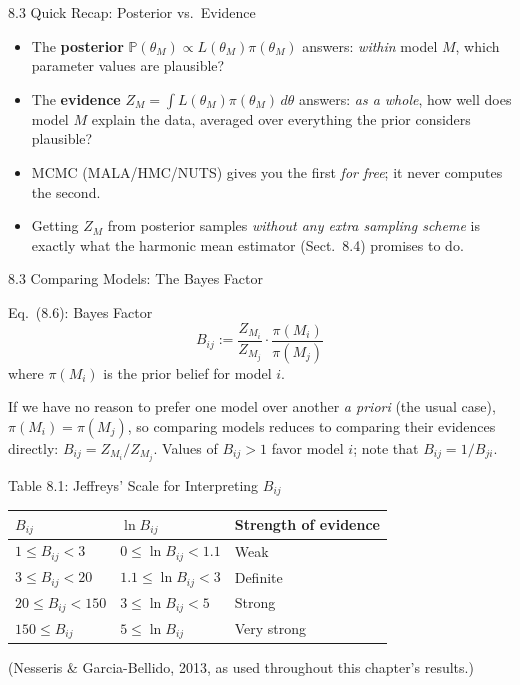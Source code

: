 \documentclass[aspectratio=169,10pt]{beamer}
\begin{document}
\begin{frame}{8.3 Quick Recap: Posterior vs.\ Evidence}
\begin{itemize}
  \item The \textbf{posterior} $\mathbb{P}(\theta_M) \propto L(\theta_M)\pi(\theta_M)$ answers: \emph{within} model $M$, which parameter values are plausible?
  \item The \textbf{evidence} $Z_M = \int L(\theta_M)\pi(\theta_M)\,d\theta$ answers: \emph{as a whole}, how well does model $M$ explain the data, averaged over everything the prior considers plausible?
  \item MCMC (MALA/HMC/NUTS) gives you the first \emph{for free}; it never computes the second.
  \item Getting $Z_M$ from posterior samples \emph{without any extra sampling scheme} is exactly what the harmonic mean estimator (Sect.\ 8.4) promises to do.
\end{itemize}
\end{frame}

\begin{frame}[allowframebreaks]{8.3 Comparing Models: The Bayes Factor}

\begin{block}{Eq.\ (8.6): Bayes Factor}
\[
B_{ij} := \frac{Z_{M_i}}{Z_{M_j}} \cdot \frac{\pi(M_i)}{\pi(M_j)}
\]
where $\pi(M_i)$ is the prior belief for model $i$.
\end{block}

If we have no reason to prefer one model over another \emph{a priori} (the usual case), $\pi(M_i) = \pi(M_j)$, so comparing models reduces to comparing their evidences directly: $B_{ij} = Z_{M_i}/Z_{M_j}$. Values of $B_{ij} > 1$ favor model $i$; note that $B_{ij} = 1/B_{ji}$.

\begin{block}{Table 8.1: Jeffreys' Scale for Interpreting $B_{ij}$}
\centering\scriptsize
\begin{tabular}{lll}
\toprule
$B_{ij}$ & $\ln B_{ij}$ & Strength of evidence\\
\midrule
$1 \le B_{ij} < 3$ & $0 \le \ln B_{ij} < 1.1$ & Weak\\
$3 \le B_{ij} < 20$ & $1.1 \le \ln B_{ij} < 3$ & Definite\\
$20 \le B_{ij} < 150$ & $3 \le \ln B_{ij} < 5$ & Strong\\
$150 \le B_{ij}$ & $5 \le \ln B_{ij}$ & Very strong\\
\bottomrule
\end{tabular}
\end{block}
(Nesseris \& Garcia-Bellido, 2013, as used throughout this chapter's results.)

\end{frame}
\end{document}
